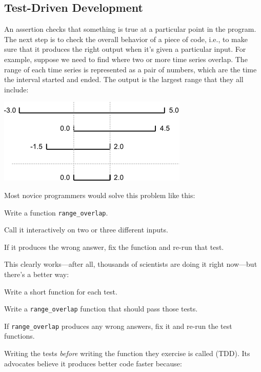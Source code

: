 \documentclass{book}
\begin{document}
\subsection{Test-Driven Development}

An assertion checks that something is true at a particular point in the
program. The next step is to check the overall behavior of a piece of
code, i.e., to make sure that it produces the right output when it's
given a particular input. For example, suppose we need to find where two
or more time series overlap. The range of each time series is
represented as a pair of numbers, which are the time the interval
started and ended. The output is the largest range that they all
include:

\includegraphics{novice/python/img/python-overlapping-ranges.png}

Most novice programmers would solve this problem like this:

\begin{swcenumerate}
\item
  Write a function \texttt{range\_overlap}.
\item
  Call it interactively on two or three different inputs.
\item
  If it produces the wrong answer, fix the function and re-run that
  test.
\end{swcenumerate}

This clearly works---after all, thousands of scientists are doing it
right now---but there's a better way:

\begin{swcenumerate}
\item
  Write a short function for each test.
\item
  Write a \texttt{range\_overlap} function that should pass those tests.
\item
  If \texttt{range\_overlap} produces any wrong answers, fix it and
  re-run the test functions.
\end{swcenumerate}

Writing the tests \emph{before} writing the function they exercise is
called 
(TDD). Its advocates believe it produces better code faster because:
\end{document}
